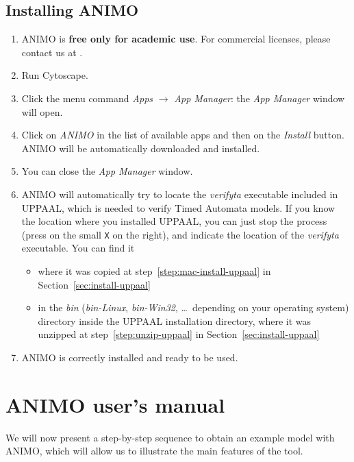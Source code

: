 \documentclass{article}
\newcommand{\winsymbol}{\raisebox{-0.8ex}{\pgfuseimage{win-logo}}}
\newcommand{\macsymbol}{\raisebox{-0.5ex}{\pgfuseimage{mac-logo}}}
\newcommand{\linuxsymbol}{\raisebox{-0.8ex}{\pgfuseimage{linux-logo}}}
\newcommand{\macpc}[2]{\begin{itemize}
    \item[\macsymbol] #1
    \item[\winsymbol\ \  \linuxsymbol] #2
\end{itemize}}
\newcommand{\contactemail}{\pgfuseimage{contact-email}}
\begin{document}


\subsection{Installing ANIMO}\label{sec:install-animo}
\begin{enumerate}
\item ANIMO is {\bfseries free only for academic use}. For commercial licenses, please contact us at \contactemail.
\item Run Cytoscape.
\item Click the menu command \emph{Apps} $\rightarrow$ \emph{App Manager}: the \emph{App Manager}
window will open.
\item Click on \emph{ANIMO} in the list of available apps and then on the \emph{Install} button.
 ANIMO will be automatically downloaded and installed.
\item You can close the \emph{App Manager} window.
\item ANIMO will automatically try to locate the \emph{verifyta} executable included in UPPAAL, which is needed to verify Timed Automata models.
If you know the location where you installed UPPAAL, you can just stop the process (press on the small {\tt X} on the right), and indicate the
location of the \emph{verifyta} executable.
You can find it 
\macpc{where it was copied at step~\ref{step:mac-install-uppaal} in Section~\ref{sec:install-uppaal}}{in the \emph{bin} (\emph{bin-Linux}, \emph{bin-Win32},
\dots\ depending on your operating system)
directory inside the UPPAAL installation directory, where it was unzipped at step~\ref{step:unzip-uppaal} in Section~\ref{sec:install-uppaal}}
\item ANIMO is correctly installed and ready to be used.
\end{enumerate}

\clearpage
\section{ANIMO user's manual}\label{sec:animo-manual}
We will now present a step-by-step sequence to obtain an example model
with ANIMO, which will allow us to illustrate the main features of the tool.
\end{document}
